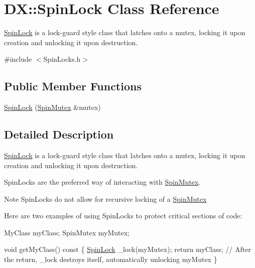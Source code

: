 \hypertarget{class_d_x_1_1_spin_lock}{\section{D\-X\-:\-:Spin\-Lock Class Reference}
\label{class_d_x_1_1_spin_lock}
}


\hyperlink{class_d_x_1_1_spin_lock}{Spin\-Lock} is a lock-\/guard style class that latches onto a mutex, locking it upon creation and unlocking it upon destruction.  




{\ttfamily \#include $<$Spin\-Locks.\-h$>$}

\subsection*{Public Member Functions}
\begin{DoxyCompactItemize}
\item 
\hyperlink{class_d_x_1_1_spin_lock_a70382a476699db23556e86fbf7c0040f}{Spin\-Lock} (\hyperlink{class_d_x_1_1_spin_mutex}{Spin\-Mutex} \&mutex)
\end{DoxyCompactItemize}


\subsection{Detailed Description}
\hyperlink{class_d_x_1_1_spin_lock}{Spin\-Lock} is a lock-\/guard style class that latches onto a mutex, locking it upon creation and unlocking it upon destruction. 

Spin\-Locks are the preferred way of interacting with \hyperlink{class_d_x_1_1_spin_mutex}{Spin\-Mutex}.

\begin{DoxyNote}{Note}
Spin\-Locks do not allow for recursive locking of a \hyperlink{class_d_x_1_1_spin_mutex}{Spin\-Mutex}
\end{DoxyNote}
Here are two examples of using Spin\-Locks to protect critical sections of code\-: 
\begin{DoxyCode}
MyClass myClass;
SpinMutex myMutex;

\textcolor{keywordtype}{void} getMyClass()\textcolor{keyword}{ const}
\textcolor{keyword}{}\{
    \hyperlink{class_d_x_1_1_spin_lock_a70382a476699db23556e86fbf7c0040f}{SpinLock} \_lock(myMutex);
    \textcolor{keywordflow}{return} myClass; \textcolor{comment}{// After the return, \_lock destroys itself, automatically unlocking myMutex}
\}
\end{DoxyCode}



